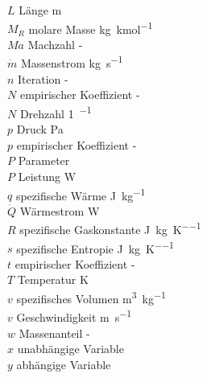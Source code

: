 \begin{tabbing}
    $L$         \>  Länge                               \>  \si{\m}   \\
    $M_R$       \>  molare Masse                        \>  \si{\kg\per\kmol} \\
    $Ma$        \>  Machzahl                            \>  -   \\
    $\dot{m}$   \>  Massenstrom                         \>  \si{\kg\per\s} \\
    $n$         \>  Iteration                           \>  -  \\
    $N$         \>  empirischer Koeffizient             \>  -  \\
    $N$         \>  Drehzahl                            \>  \si{1\per\min} \\
    $p$         \>  Druck                               \>  \si{\Pa}  \\
    $p$         \>  empirischer Koeffizient             \>  -  \\
    $P$         \>  Parameter                           \>   \\
    $P$         \>  Leistung                            \>  \si{\W}   \\
    $q$         \>  spezifische Wärme                   \>  \si{\J\per\kg} \\
    $\dot{Q}$   \>  Wärmestrom                          \>  \si{\W}   \\
    $R$         \>  spezifische Gaskonstante            \>  \si{\J\per\kg\per\K} \\
    $s$         \>  spezifische Entropie                \>  \si{\J\per\kg\per\K} \\
    $t$         \>  empirischer Koeffizient             \>  -  \\
    $T$         \>  Temperatur                          \>  \si{\K}   \\ 
    $v$         \>  spezifisches Volumen                \>  \si{\m\cubed\per\kg} \\
    $v$         \>  Geschwindigkeit                     \>  \si{\m\per\s} \\
    $w$         \>  Massenanteil                        \>  -   \\
    $x$         \>  unabhängige Variable                \>    \\
    $y$         \>  abhängige Variable                  \>   \\
\end{tabbing}

